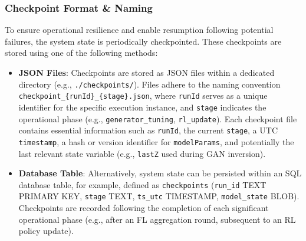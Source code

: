 \documentclass{article}
\begin{document}
\subsubsection{Checkpoint Format \& Naming}
To ensure operational resilience and enable resumption following potential failures, the system state is periodically checkpointed. These checkpoints are stored using one of the following methods:
\begin{itemize}[label=\textbf{\textbullet}]
    \item \textbf{JSON Files}: Checkpoints are stored as JSON files within a dedicated directory (e.g., \texttt{./checkpoints/}). Files adhere to the naming convention \texttt{checkpoint\_\{runId\}\_\{stage\}.json}, where \texttt{runId} serves as a unique identifier for the specific execution instance, and \texttt{stage} indicates the operational phase (e.g., \texttt{generator\_tuning}, \texttt{rl\_update}). Each checkpoint file contains essential information such as \texttt{runId}, the current \texttt{stage}, a UTC \texttt{timestamp}, a hash or version identifier for \texttt{modelParams}, and potentially the last relevant state variable (e.g., \texttt{lastZ} used during GAN inversion).
    \item \textbf{Database Table}: Alternatively, system state can be persisted within an SQL database table, for example, defined as \texttt{checkpoints} (\texttt{run\_id} TEXT PRIMARY KEY, \texttt{stage} TEXT, \texttt{ts\_utc} TIMESTAMP, \texttt{model\_state} BLOB). Checkpoints are recorded following the completion of each significant operational phase (e.g., after an FL aggregation round, subsequent to an RL policy update).
\end{itemize}
\end{document}
